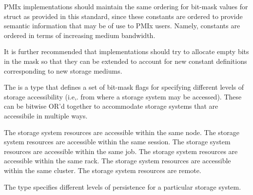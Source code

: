 \adviceimplstart
PMIx implementations should maintain the same ordering for bit-mask values for  struct as provided in this standard, since these constants are ordered to provide semantic information that may be of use to PMIx users. Namely,  constants are ordered in terms of increasing medium bandwidth.

It is further recommended that implementations should try to allocate empty bits in the mask so that they can be extended to account for new constant definitions corresponding to new storage mediums.
\adviceimplend

\provisionalMarker{}

The  is a  type that defines a set of bit-mask flags for specifying different levels of storage accessibility (i.e,. from where a storage system may be accessed). These can be bitwise OR'd together to accommodate storage systems that are accessibile in multiple ways.

\begin{constantdesc}
%
The storage system resources are accessible within the same node.
%
The storage system resources are accessible within the same session.
%
The storage system resources are accessible within the same job.
%
The storage system resources are accessible within the same rack.
%
The storage system resources are accessible within the same cluster.
%
The storage system resources are remote.
%
\end{constantdesc}

\provisionalMarker{}

The  type specifies different levels of persistence for a particular storage system.

